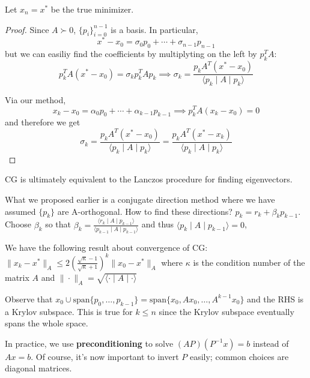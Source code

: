 \documentclass[english, 11pt]{article}
\begin{document}
\begin{thrm}
Let $x_n = x^*$ be the true minimizer. 
\end{thrm}
\begin{proof}
Since $A \succ 0$, $\{p_i\}_{i=0}^{n-1}$ is a basis. In particular,
\[
x^* - x_0 = \sigma_0 p_0 + \cdots + \sigma_{n-1} p_{n-1}
\]
but we can easiliy find the coefficients by multiplyting on the left by $p_k^T A$:
\[
p_k^T A( x^* - x_0) = \sigma_k p_k^T A p_k  \implies \sigma_k = \frac{ p_k A^T (x^* - x_0)}{\langle p_k \mid A \mid p_k \rangle}
\]

Via our method,
\[
x_k - x_0 = \alpha_0 p_0 + \cdots + \alpha_{k-1} p_{k-1} \implies p_k^T A (x_k - x_0) = 0
\]
and therefore we get
\[
\sigma_k = \frac{ p_k A^T (x^* - x_0)}{\langle p_k \mid A \mid p_k \rangle} = \frac{ p_k A^T (x^* - x_k)}{\langle p_k \mid A \mid p_k \rangle}
\]
\end{proof}

\begin{rem}
CG is ultimately equivalent to the Lanczos procedure for finding eigenvectors.
\end{rem}

\begin{rem}
What we proposed earlier is a conjugate direction method where we have assumed $\{p_k\}$ are A-orthogonal. How to find these directions? 
$p_k= r_k + \beta_k p_{k-1}$. Choose $\beta_k$ so that $\beta_k = \frac{ \langle r_k \mid A \mid p_{k-1} \rangle}{\langle p_{k-1} \mid A \mid p_{k-1} \rangle }$ and thus $\langle p_k \mid A \mid p_{k-1} \rangle =0$,
\end{rem}

\begin{rem}
We have the following result about convergence of CG: $\|x_k - x^* \|_A \le 2 \left( \frac{ \sqrt{\kappa} -1 }{\sqrt{\kappa}+1} \right)^{k} \|x_0 - x^*\|_A$ where $\kappa$ is the condition number of the matrix $A$ and $\|\cdot\|_A = \sqrt{ \langle \cdot \mid A \mid \cdot \rangle }$
\end{rem}


\begin{rem}
Observe that $x_0 \cup \text{span} \{p_0,\dots,p_{k-1} \} = \text{span} \{ x_0,Ax_0,\dots,A^{k-1} x_0 \}$ and the RHS is a Krylov subspace. This is true for $k \le n$ since the Krylov subspace eventually spans the whole space.
\end{rem}

\begin{rem}
In practice, we use {\bf preconditioning} to solve $(A P) (P^{-1} x) = b$ instead of $Ax=b$. Of course, it's now important to invert $P$ easily; common choices are diagonal matrices.
\end{rem}
\end{document}
